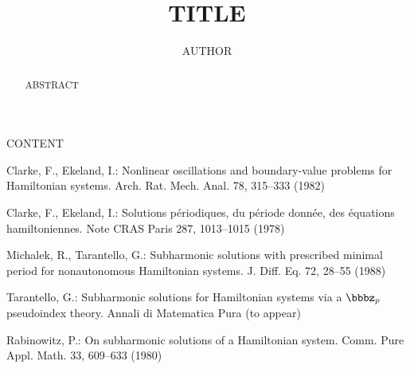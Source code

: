 \documentclass{llncs}
\begin{document}
\title{TITLE}

\author{AUTHOR}


\maketitle              %

\begin{abstract}

ABSTRACT

\end{abstract}

CONTENT

%
%
\begin{thebibliography}{5}
%
Clarke, F., Ekeland, I.:
Nonlinear oscillations and
boundary-value problems for Hamiltonian systems.
Arch. Rat. Mech. Anal. 78, 315--333 (1982)

Clarke, F., Ekeland, I.:
Solutions p\'{e}riodiques, du
p\'{e}riode donn\'{e}e, des \'{e}quations hamiltoniennes.
Note CRAS Paris 287, 1013--1015 (1978)

Michalek, R., Tarantello, G.:
Subharmonic solutions with prescribed minimal
period for nonautonomous Hamiltonian systems.
J. Diff. Eq. 72, 28--55 (1988)

Tarantello, G.:
Subharmonic solutions for Hamiltonian
systems via a $\bbbz_{p}$ pseudoindex theory.
Annali di Matematica Pura (to appear)

Rabinowitz, P.:
On subharmonic solutions of a Hamiltonian system.
Comm. Pure Appl. Math. 33, 609--633 (1980)

\end{thebibliography}
\end{document}
